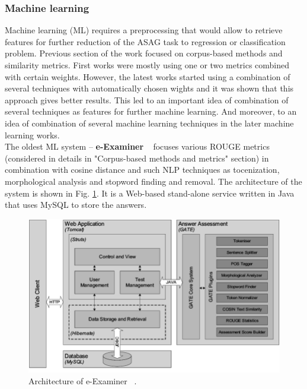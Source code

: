 \subsubsection{Machine learning}

Machine learning (ML) requires a preprocessing that would allow to retrieve features for further reduction of the ASAG task to regression or classification problem. Previous section of the work focused on corpus-based methods and similarity metrics. First works were mostly using one or two metrics combined with certain weights. However, the latest works started using a combination of several techniques with automatically chosen wights and it was shown that this approach gives better results. This led to an important idea of combination of several techniques as features for further machine learning. And moreover, to an idea of combination of several machine learning techniques in the later machine learning works. \\

The oldest ML system -- \textbf{e-Examiner} ~\cite{e-examiner} focuses various ROUGE metrics (considered in details in "Corpus-based methods and metrics" section) in combination with cosine distance and such NLP techniques as tocenization, morphological analysis and stopword finding and removal. The architecture of the system is shown in Fig. \ref{fig:e-examiner}. It is a  Web-based stand-alone service written in Java that uses MySQL to store the answers.\\


\begin{figure}[h!]
  \centering
  \includegraphics[width=\textwidth]{img/e-examiner}
    \caption{ Architecture of e-Examiner ~\cite{e-examiner}. }\label{fig:e-examiner}
\end{figure}

